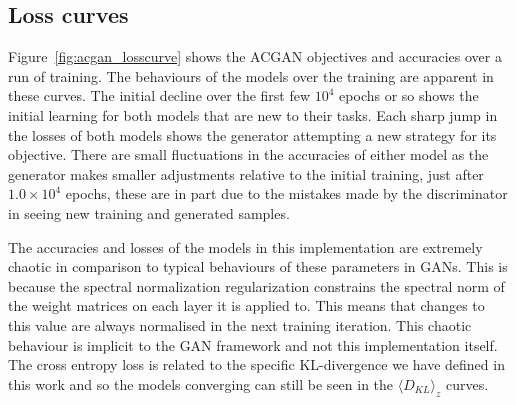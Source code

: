 \documentclass[twocolumn]{article}
\numberwithin{equation}{section}
\begin{document}

\subsection{Loss curves}

Figure~\ref{fig:acgan_losscurve} shows the ACGAN objectives and accuracies over a run of training. The behaviours of the 
models over the training are apparent in these curves. The initial decline over the first few $10^4$ epochs or so 
shows the initial learning for both models that are new to their tasks. Each sharp jump in the losses of both models shows
the  generator attempting a new strategy for its objective. There are small fluctuations in the accuracies of either model 
as the generator makes smaller adjustments relative to the initial training, just after $1.0\times10^4$ epochs, these are 
in part due to the mistakes made by the discriminator in seeing new training and generated samples. 

The accuracies and losses of the models in this implementation are extremely chaotic in comparison to typical behaviours of
these parameters in GANs. This is because the spectral normalization regularization constrains the spectral norm of the weight
matrices on each layer it is applied to. This means that changes to this value are always normalised in the next training
iteration. This chaotic behaviour is implicit to the GAN framework and not this implementation itself. The cross entropy loss
is related to the specific KL-divergence we have defined in this work and so the models converging can still be seen in the
$\langle D_{KL}\rangle_z$ curves.

\end{document}
